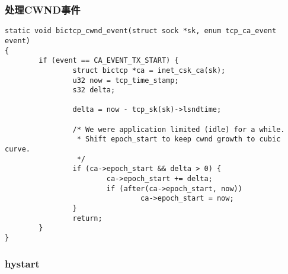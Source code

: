 \subsubsection{处理CWND事件}

\begin{verbatim}
static void bictcp_cwnd_event(struct sock *sk, enum tcp_ca_event event)
{
        if (event == CA_EVENT_TX_START) {
                struct bictcp *ca = inet_csk_ca(sk);
                u32 now = tcp_time_stamp;
                s32 delta;

                delta = now - tcp_sk(sk)->lsndtime;

                /* We were application limited (idle) for a while.
                 * Shift epoch_start to keep cwnd growth to cubic curve.
                 */
                if (ca->epoch_start && delta > 0) {
                        ca->epoch_start += delta;
                        if (after(ca->epoch_start, now))
                                ca->epoch_start = now;
                }
                return;
        }
}
\end{verbatim}

\subsubsection{hystart}
